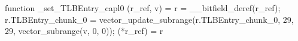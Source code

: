 function _set_TLBEntry_capl0 (r_ref, v) = {
    r = __bitfield_deref(r_ref);
    r.TLBEntry_chunk_0 = vector_update_subrange(r.TLBEntry_chunk_0, 29, 29, vector_subrange(v, 0, 0));
    (*r_ref) = r
}
